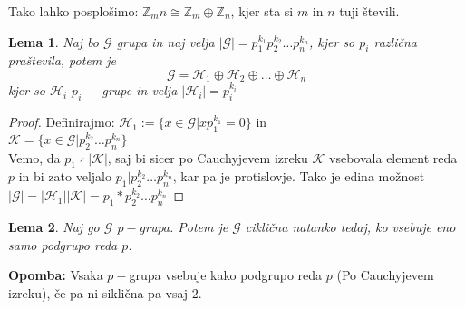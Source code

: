 \documentclass[a4paper]{article}
\newcounter{environment:definition_counter}
\newcounter{environment:theorem_counter}
\newcounter{environment:statement_counter}
\newenvironment{remark}
{\textbf{Opomba:}}
{}
\newtheorem{lemma}{Lema}
\begin{document}
Tako lahko posplošimo: $\mathbb{Z}_mn \cong \mathbb{Z}_m \oplus \mathbb{Z}_n$, kjer sta si $m$ in $n$ tuji števili.




\begin{lemma}
Naj bo $\mathcal{G}$ grupa in naj velja $|\mathcal{G}| = p_1^{k_1}p_2^{k_2} \dots p_n^{k_n}$, kjer so $p_i$ različna praštevila, potem je 
$$ \mathcal{G} = \mathcal{H}_1 \oplus \mathcal{H}_2 \oplus \dots \oplus \mathcal{H}_n$$
kjer so $\mathcal{H}_i$ $p_i-$ grupe in velja $|\mathcal{H}_i| = p_i^{k_i}$
\end{lemma}

\begin{proof}
Definirajmo: $\mathcal{H}_1 := \{ x \in \mathcal{G} | xp_1^{k_1} = 0\}$ in \\
$\mathcal{K} =  \{ x \in \mathcal{G} | p_2^{k_2} \dots p_n^{k_n} \}$\\
Vemo, da $p_1 \nmid | \mathcal{K}|$, saj bi sicer po Cauchyjevem izreku $\mathcal{K}$ vsebovala element reda $p$ in bi zato veljalo $p_1 | p_2^{k_2} \dots p_n^{k_n}$, kar pa je protislovje.
Tako je edina možnost $|\mathcal{G}| = |\mathcal{H}_1| |\mathcal{K}| = p_1 * p_2^{k_2} \dots p_n^{k_n}$
\end{proof}

\begin{lemma}
Naj go $\mathcal{G}$ $p-$grupa. Potem je $\mathcal{G}$ ciklična natanko tedaj, ko vsebuje eno samo podgrupo reda $p$.
\end{lemma}

\begin{remark}
Vsaka $p-$grupa vsebuje kako podgrupo reda $p$ (Po Cauchyjevem izreku), če pa ni siklična pa vsaj $2$.
\end{remark}
\end{document}
